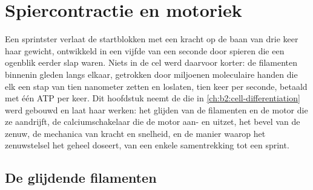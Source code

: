\chapter{Spiercontractie en motoriek}\label{ch:b2:muscle-movement}

Een sprintster verlaat de startblokken met een kracht op de baan van drie
keer haar gewicht, ontwikkeld in een vijfde van een seconde door spieren die
een ogenblik eerder slap waren. Niets in de cel werd daarvoor korter: de
filamenten binnenin gleden langs elkaar, getrokken door miljoenen moleculaire
handen die elk een stap van tien nanometer zetten en loslaten, tien keer per
seconde, betaald met één ATP per keer. Dit hoofdstuk neemt de  die
in \cref{ch:b2:cell-differentiation} werd gebouwd en laat haar werken: het
glijden van de filamenten en de motor die ze aandrijft, de calciumschakelaar
die de motor aan- en uitzet, het bevel van de zenuw, de mechanica van kracht
en snelheid, en de manier waarop het zenuwstelsel het geheel doseert, van een
enkele samentrekking tot een sprint.

\section{De glijdende filamenten}

